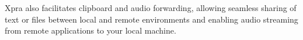 Xpra also facilitates clipboard and audio forwarding, allowing seamless sharing of text or files between local and remote environments and enabling audio streaming from remote applications to your local machine. \\
















